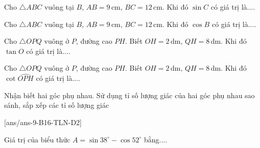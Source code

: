 \begin{ex}%
	Cho $\triangle ABC$ vuông tại $B$, $AB=9\,\text{cm}$, $BC=12\,\text{cm}$. Khi đó $\sin C$ có giá trị là....
\end{ex}
\begin{ex}%
	Cho $\triangle ABC$ vuông tại $B$, $AB=9\,\text{cm}$, $BC=12\,\text{cm}$. Khi đó $\cos B$ có giá trị là....
\end{ex}
\begin{ex}%
	Cho $\triangle OPQ$ vuông ở $P$, đường cao $PH$. Biết $OH=2\,\text{dm}$, $QH=8\,\text{dm}$. Khi đó $\tan O$ có giá trị là....
\end{ex}
\begin{ex}%
	Cho $\triangle OPQ$ vuông ở $P$, đường cao $PH$. Biết $OH=2\,\text{dm}$, $QH=8\,\text{dm}$. Khi đó $\cot \widehat{OPH}$ có giá trị là....
\end{ex}
\begin{dang}{Nhận biết hai góc phụ nhau. Sử dụng tỉ số lượng giác của hai góc phụ nhau sao sánh, sắp xếp các tỉ số lượng giác}
\end{dang}
[ans/ans-9-B16-TLN-D2]
\begin{ex}%
	Giá trị của biểu thức $A=\sin 38^{\circ}-\cos 52^{\circ}$ bằng....
\end{ex}
